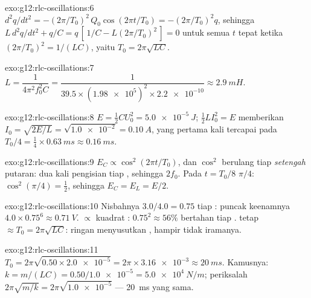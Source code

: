 \begin{solution}{exo:g12:rlc-oscillations:6}
$d^2q/dt^2 = -(2\pi/T_0)^2\,Q_0\cos(2\pi t/T_0) = -(2\pi/T_0)^2 q$,
sehingga $L\,d^2q/dt^2 + q/C = q\,[\,1/C - L(2\pi/T_0)^2\,] = 0$ untuk semua $t$
tepat ketika $(2\pi/T_0)^2 = 1/(LC)$, yaitu $T_0 = 2\pi\sqrt{LC}$.
\end{solution}

\begin{solution}{exo:g12:rlc-oscillations:7}
$L = \dfrac{1}{4\pi^2 f_0^2 C} = \dfrac{1}{39.5 \times
(\num{1.98e5})^2 \times \num{2.2e-10}} \approx \qty{2.9}{mH}$.
\end{solution}

\begin{solution}{exo:g12:rlc-oscillations:8}
$E = \tfrac12 CU_0^2 = \qty{5.0e-5}{J}$; $\tfrac12 LI_0^2 = E$ memberikan
$I_0 = \sqrt{2E/L} = \sqrt{\num{1.0e-2}} = \qty{0.10}{A}$, yang pertama kali
tercapai pada $T_0/4 = \tfrac14 \times \qty{0.63}{ms} \approx
\qty{0.16}{ms}$.
\end{solution}

\begin{solution}{exo:g12:rlc-oscillations:9}
$E_C \propto \cos^2(2\pi t/T_0)$, dan $\cos^2$ berulang tiap
\emph{setengah} putaran: dua kali pengisian  tiap , sehingga
$2f_0$. Pada $t = T_0/8$  $\pi/4$:
$\cos^2(\pi/4) = \tfrac12$, sehingga $E_C = E_L = E/2$.
\end{solution}

\begin{solution}{exo:g12:rlc-oscillations:10}
Nisbahnya $3.0/4.0 = 0.75$ tiap : puncak keenamnya
$4.0 \times 0.75^6 \approx \qty{0.71}{V}$.  $\propto$ kuadrat
: $0.75^2 \approx 56\%$ bertahan tiap .
 tetap $\approx T_0 = 2\pi\sqrt{LC}$:  ringan
menyusutkan , hampir tidak iramanya.
\end{solution}

\begin{solution}{exo:g12:rlc-oscillations:11}
$T_0 = 2\pi\sqrt{0.50 \times \num{2.0e-5}} = 2\pi \times
\num{3.16e-3} \approx \qty{20}{ms}$. Kamusnya: $k = m/(LC) =
0.50/\num{1.0e-5} = \qty{5.0e4}{N/m}$; periksalah
$2\pi\sqrt{m/k} = 2\pi\sqrt{\num{1.0e-5}}$ --- \qty{20}{ms} yang sama.
\end{solution}

